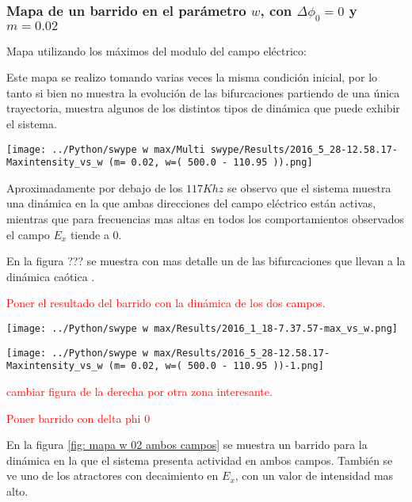 		
		
		\subsubsection{Mapa de un barrido en el parámetro $w$, con $\Delta \phi_0 =0 $ y $m=0.02$}
		
		Mapa utilizando los máximos del modulo del campo eléctrico:
		
		Este mapa se realizo tomando varias veces la misma condición inicial, por lo tanto si bien no muestra la evolución de las bifurcaciones partiendo de una única trayectoria, muestra algunos de los distintos tipos de dinámica que puede exhibir el sistema.
		
		\begin{center}
			\texttt{[image: ../Python/swype w max/Multi swype/Results/2016\_5\_28-12.58.17-Maxintensity\_vs\_w (m= 0.02, w=( 500.0 - 110.95 )).png]}
			\label{mapa 2 02}
		\end{center}
		
		Aproximadamente por debajo de los $117 Khz$ se observo que el sistema muestra una dinámica en la que ambas direcciones del campo eléctrico están activas, mientras que para frecuencias mas altas en todos los comportamientos observados el campo $E_x$ tiende a $0$.
		
		En la figura ??? se muestra con mas detalle un de las  bifurcaciones que llevan a la dinámica caótica .
		
		\textcolor{red}{Poner el resultado del barrido con la dinámica de los dos campos.}
		
		\begin{minipage}{0.5\textwidth}
			\centering
			\texttt{[image: ../Python/swype w max/Results/2016\_1\_18-7.37.57-max\_vs\_w.png]}
		\end{minipage}
		\begin{minipage}{0.5\textwidth}
			\centering
			\texttt{[image: ../Python/swype w max/Results/2016\_5\_28-12.58.17-Maxintensity\_vs\_w (m= 0.02, w=( 500.0 - 110.95 ))-1.png]}
		\end{minipage}
		
		\textcolor{red}{cambiar figura de la derecha por otra zona interesante.}	
			
		\textcolor{red}{Poner barrido con delta phi 0 }	
		
		En la figura \ref{fig: mapa w 02 ambos campos} se muestra un barrido para la dinámica en la que el sistema presenta actividad en ambos campos.
		También se ve uno de los atractores con decaimiento en $E_x$, con un valor de intensidad mas alto.
		
